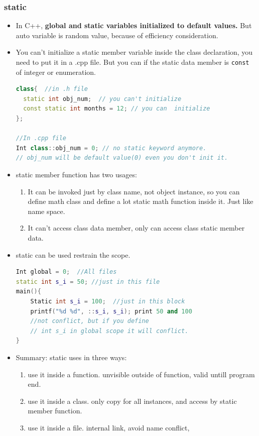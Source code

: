 \documentclass[a4paper,12pt,twoside]{book}
\begin{document}
\subsubsection{static}
\begin{itemize}


\item In C++, \textbf{global and static variables initialized to default values.}  But auto variable is random value, because of efficiency consideration.

\item You can't initialize a static member variable inside the class declaration, you need to put it in a .cpp file.   But you can if the static data member is \texttt{const} of integer or enumeration.
\begin{lstlisting}[frame=single, language=c++]
class{  //in .h file
  static int obj_num;  // you can't initialize
  const static int months = 12; // you can  initialize
};

//In .cpp file
Int class::obj_num = 0; // no static keyword anymore.
// obj_num will be default value(0) even you don't init it.
\end{lstlisting}

\item static member function has two usages:
\begin{enumerate}
\item It can be invoked just by class name, not object instance, so you can define math class and define a lot static math function inside it.  Just like name space.
\item It can't access class data member, only can access class static member data.
\end{enumerate}

\item static can be used restrain the scope.
\begin{lstlisting}[frame=single, language=c++]
Int global = 0;  //All files
static int s_i = 50; //just in this file
main(){
    Static int s_i = 100;  //just in this block
    printf("%d %d", ::s_i, s_i); print 50 and 100
    //not conflict, but if you define 
    // int s_i in global scope it will conflict. 
}
\end{lstlisting}

\item Summary: static uses in three ways:
\begin{enumerate}
\item use it inside a function. unvisible outside of function, valid untill program end.
\item use it inside a class. only copy for all instances, and access by static member function.
\item use it inside a file. internal link, avoid name conflict, 
\end{enumerate}

\end{itemize}
\end{document}

